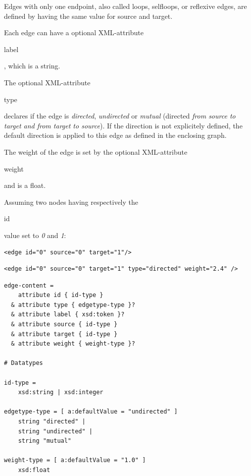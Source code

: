 \documentclass[a4paper,10pt]{article}
\begin{document}
Edges with only one endpoint, also called loops, selfloops, or reflexive edges, are defined by having the same value for source and target.

Each edge can have a optional XML-attribute \begin{footnotesize}label\end{footnotesize}, which is a string.

The optional XML-attribute \begin{footnotesize}type\end{footnotesize} declares if the edge is \textit{directed}, \textit{undirected} or \textit{mutual} (directed \textit{from source to target and from target to source}). If the direction is not explicitely defined, the default direction is applied to this edge as defined in the enclosing graph.

The weight of the edge is set by the optional XML-attribute \begin{footnotesize}weight\end{footnotesize} and is a float.

Assuming two nodes having respectively the \begin{footnotesize}id\end{footnotesize} value set to \textit{0} and \textit{1}:

\lstset{ style=gexf }
\begin{lstlisting}[caption={An edge!},label=anEdge]
<edge id="0" source="0" target="1"/>
\end{lstlisting}

\lstset{ style=gexf }
\begin{lstlisting}[caption={A more complete edge},label=aMoreEdge]
<edge id="0" source="0" target="1" type="directed" weight="2.4" />
\end{lstlisting}

\lstset{ style=rnc }
\begin{lstlisting}[caption={Edge Specification},label=edgeRNC]
edge-content =
    attribute id { id-type }
  & attribute type { edgetype-type }?
  & attribute label { xsd:token }?
  & attribute source { id-type }
  & attribute target { id-type }
  & attribute weight { weight-type }?

# Datatypes

id-type =
    xsd:string | xsd:integer

edgetype-type = [ a:defaultValue = "undirected" ]
    string "directed" |
    string "undirected" |
    string "mutual"

weight-type = [ a:defaultValue = "1.0" ]
    xsd:float
\end{lstlisting}
\end{document}
